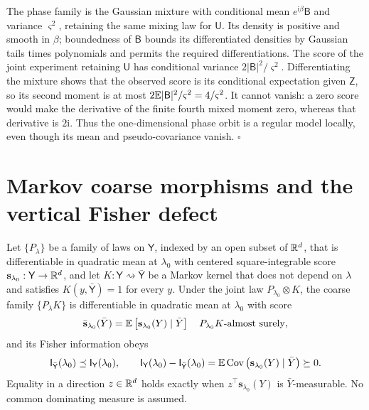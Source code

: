 The phase family is the Gaussian mixture with conditional mean
$e^{\mathrm i\beta}\mathsf B$ and variance $\varsigma^2$, retaining the same
mixing law for $\mathsf U$. Its density is positive and smooth in $\beta$;
boundedness of $\mathsf B$ bounds its differentiated densities by Gaussian
tails times polynomials and permits the required differentiations. The score
of the joint experiment retaining $\mathsf U$ has conditional variance
$2|\mathsf B|^2/\varsigma^2$. Differentiating the mixture shows that the
observed score is its conditional expectation given $\mathsf Z$, so its
second moment is at most $2\mathbb E|\mathsf B|^2/\varsigma^2=4/\varsigma^2$.
It cannot vanish: a zero score would make the derivative of the finite
fourth mixed moment zero, whereas that derivative is $2\mathrm i$.
Thus the one-dimensional phase orbit is a regular model locally, even
though its mean and pseudo-covariance vanish. $\square$

\section{Markov coarse morphisms and the vertical Fisher defect}
\label{sec:pb-fisher-defect}
\label{sec:cg-fisher-contraction}

Let $\{P_\lambda\}$ be a family of laws on $\mathsf Y$, indexed by an open subset of
$\mathbb R^d$, that is differentiable in quadratic mean at $\lambda_0$ with centered
square-integrable score $\mathbf s_{\lambda_0}:\mathsf Y\to\mathbb R^d$, and let
$K:\mathsf Y\rightsquigarrow\bar{\mathsf Y}$ be a Markov kernel that does not depend on
$\lambda$ and satisfies $K(y,\bar{\mathsf Y})=1$ for every $y$.  Under the joint law
$P_{\lambda_0}\otimes K$, the coarse family $\{P_\lambda K\}$ is differentiable in
quadratic mean at $\lambda_0$ with score
\begin{equation}
\bar{\mathbf s}_{\lambda_0}(\bar Y)
=\mathbb E\left[\mathbf s_{\lambda_0}(Y)\mid\bar Y\right]
\quad P_{\lambda_0}K\text{-almost surely},
\label{eq:cg-score-projection}
\end{equation}
and its Fisher information obeys
\begin{equation}
\mathsf I_{\bar{\mathsf Y}}(\lambda_0)\preceq\mathsf I_{\mathsf Y}(\lambda_0),
\qquad
\mathsf I_{\mathsf Y}(\lambda_0)-\mathsf I_{\bar{\mathsf Y}}(\lambda_0)
=\mathbb E\operatorname{Cov}\left(\mathbf s_{\lambda_0}(Y)\mid\bar Y\right)\succeq0.
\label{eq:cg-fisher-loss}
\end{equation}
Equality in a direction $z\in\mathbb R^d$ holds exactly when $z^\top\mathbf s_{\lambda_0}(Y)$
is $\bar Y$-measurable.  No common dominating measure is assumed.

